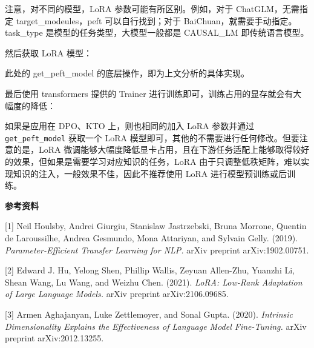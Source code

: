 \documentclass[12pt,a4paper]{book}
\begin{document}
注意，对不同的模型，LoRA 参数可能有所区别。例如，对于 ChatGLM，无需指定
target\_modeules，peft 可以自行找到；对于
BaiChuan，就需要手动指定。task\_type 是模型的任务类型，大模型一般都是
CAUSAL\_LM 即传统语言模型。

然后获取 LoRA 模型：

\begin{Shaded}
\begin{Highlighting}[]
\OperatorTok{=}
\end{Highlighting}
\end{Shaded}

此处的 get\_peft\_model 的底层操作，即为上文分析的具体实现。

最后使用 transformers 提供的 Trainer
进行训练即可，训练占用的显存就会有大幅度的降低：

\begin{Shaded}
\begin{Highlighting}[]
\OperatorTok{=}
\OperatorTok{=}
\OperatorTok{=}
\OperatorTok{=}
\OperatorTok{=}
\NormalTok{)}
\end{Highlighting}
\end{Shaded}

如果是应用在 DPO、KTO 上，则也相同的加入 LoRA 参数并通过
\texttt{get\_peft\_model} 获取一个 LoRA
模型即可，其他的不需要进行任何修改。但要注意的是，LoRA
微调能够大幅度降低显卡占用，且在下游任务适配上能够取得较好的效果，但如果是需要学习对应知识的任务，LoRA
由于只调整低秩矩阵，难以实现知识的注入，一般效果不佳，因此不推荐使用
LoRA 进行模型预训练或后训练。

\textbf{参考资料}

{[}1{]} Neil Houlsby, Andrei Giurgiu, Stanislaw Jastrzebski, Bruna
Morrone, Quentin de Laroussilhe, Andrea Gesmundo, Mona Attariyan, and
Sylvain Gelly. (2019). \emph{Parameter-Efficient Transfer Learning for
NLP.} arXiv preprint arXiv:1902.00751.

{[}2{]} Edward J. Hu, Yelong Shen, Phillip Wallis, Zeyuan Allen-Zhu,
Yuanzhi Li, Shean Wang, Lu Wang, and Weizhu Chen. (2021). \emph{LoRA:
Low-Rank Adaptation of Large Language Models.} arXiv preprint
arXiv:2106.09685.

{[}3{]} Armen Aghajanyan, Luke Zettlemoyer, and Sonal Gupta. (2020).
\emph{Intrinsic Dimensionality Explains the Effectiveness of Language
Model Fine-Tuning.} arXiv preprint arXiv:2012.13255.
\end{document}
